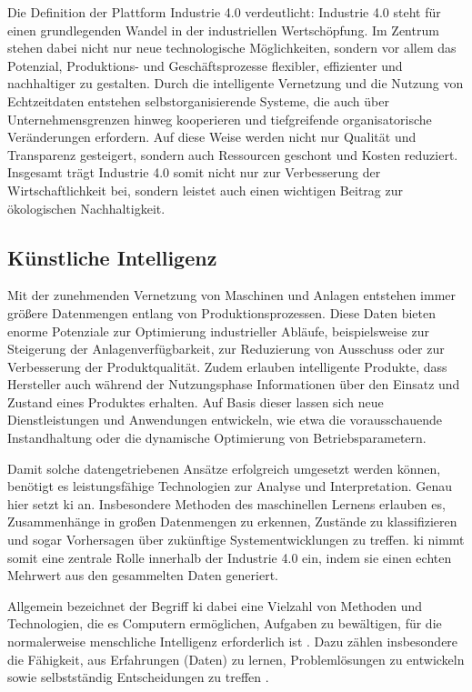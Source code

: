 \newpage
Die Definition der Plattform Industrie 4.0 verdeutlicht: Industrie 4.0 steht für einen grundlegenden Wandel in der industriellen Wertschöpfung.
Im Zentrum stehen dabei nicht nur neue technologische Möglichkeiten, sondern vor allem das Potenzial, Produktions- und Geschäftsprozesse flexibler, effizienter und nachhaltiger zu gestalten.
Durch die intelligente Vernetzung und die Nutzung von Echtzeitdaten entstehen selbstorganisierende Systeme, die auch über Unternehmensgrenzen hinweg kooperieren und tiefgreifende organisatorische Veränderungen erfordern.
Auf diese Weise werden nicht nur Qualität und Transparenz gesteigert, sondern auch Ressourcen geschont und Kosten reduziert.
Insgesamt trägt Industrie 4.0 somit nicht nur zur Verbesserung der Wirtschaftlichkeit bei, sondern leistet auch einen wichtigen Beitrag zur ökologischen Nachhaltigkeit.

\subsection{Künstliche Intelligenz}
Mit der zunehmenden Vernetzung von Maschinen und Anlagen entstehen immer größere Datenmengen entlang von Produktionsprozessen.
Diese Daten bieten enorme Potenziale zur Optimierung industrieller Abläufe, beispielsweise zur Steigerung der Anlagenverfügbarkeit, zur Reduzierung von Ausschuss oder zur Verbesserung der Produktqualität.
Zudem erlauben intelligente Produkte, dass Hersteller auch während der Nutzungsphase Informationen über den Einsatz und Zustand eines Produktes erhalten.
Auf Basis dieser lassen sich neue Dienstleistungen und Anwendungen entwickeln, wie etwa die vorausschauende Instandhaltung oder die dynamische Optimierung von Betriebsparametern.

Damit solche datengetriebenen Ansätze erfolgreich umgesetzt werden können, benötigt es leistungsfähige Technologien zur Analyse und Interpretation.
Genau hier setzt \acs{ki} an.
Insbesondere Methoden des maschinellen Lernens erlauben es, Zusammenhänge in großen Datenmengen zu erkennen, Zustände zu klassifizieren und sogar Vorhersagen über zukünftige Systementwicklungen zu treffen. \cite{KIEinführung} 
\acs{ki} nimmt somit eine zentrale Rolle innerhalb der Industrie 4.0 ein, indem sie einen echten Mehrwert aus den gesammelten Daten generiert.

Allgemein bezeichnet der Begriff \acs{ki} dabei eine Vielzahl von Methoden und Technologien, die es Computern ermöglichen, Aufgaben zu bewältigen, für die normalerweise menschliche Intelligenz erforderlich ist \cite{KIDefinition1}.
Dazu zählen insbesondere die Fähigkeit, aus Erfahrungen (Daten) zu lernen, Problemlösungen zu entwickeln sowie selbstständig Entscheidungen zu treffen \cite{KIDefinition2}.

